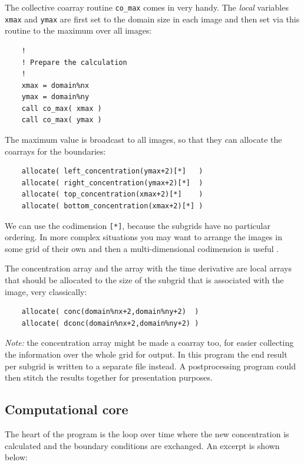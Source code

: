 \documentclass[onecolumn]{article}
\begin{document}
\begin{itemize}
The collective coarray routine \verb+co_max+ comes in very handy. The \emph{local} variables \verb+xmax+ and \verb+ymax+ are first set to the
domain size in each image and then set via this routine to the maximum over all images:

\begin{lstlisting}
    !
    ! Prepare the calculation
    !
    xmax = domain%nx
    ymax = domain%ny
    call co_max( xmax )
    call co_max( ymax )
\end{lstlisting}

The maximum value is broadcast to all images, so that they can allocate the coarrays for the boundaries:

\begin{lstlisting}
    allocate( left_concentration(ymax+2)[*]   )
    allocate( right_concentration(ymax+2)[*]  )
    allocate( top_concentration(xmax+2)[*]    )
    allocate( bottom_concentration(xmax+2)[*] )
\end{lstlisting}

We can use the codimension \verb+[*]+, because the subgrids have no particular ordering. In more complex situations you may want to
arrange the images in some grid of their own and then a multi-dimensional codimension is useful \cite{CellularAutomataCoarrays}.

The concentration array and the array with the time derivative are local arrays that should be allocated to the size of the subgrid
that is associated with the image, very classically:

\begin{lstlisting}
    allocate( conc(domain%nx+2,domain%ny+2)  )
    allocate( dconc(domain%nx+2,domain%ny+2) )
\end{lstlisting}

\emph{Note:} the concentration array might be made a coarray too, for easier collecting the information over the whole grid for output.
In this program the end result per subgrid is written to a separate file instead. A postprocessing program could then stitch the
results together for presentation purposes.
\end{itemize}

\subsection{Computational core}
The heart of the program is the loop over time where the new concentration is calculated and the boundary conditions are exchanged.
An excerpt is shown below:
\end{document}
